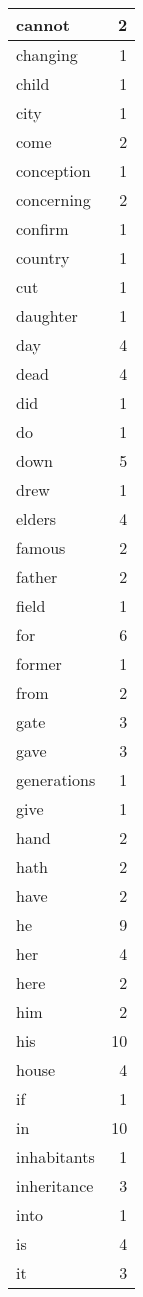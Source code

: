 \begin{center}
\begin{longtable}{l|r}
cannot & 2 \\ \hline
changing & 1 \\ \hline
child & 1 \\ \hline
city & 1 \\ \hline
come & 2 \\ \hline
conception & 1 \\ \hline
concerning & 2 \\ \hline
confirm & 1 \\ \hline
country & 1 \\ \hline
cut & 1 \\ \hline
daughter & 1 \\ \hline
day & 4 \\ \hline
dead & 4 \\ \hline
did & 1 \\ \hline
do & 1 \\ \hline
down & 5 \\ \hline
drew & 1 \\ \hline
elders & 4 \\ \hline
famous & 2 \\ \hline
father & 2 \\ \hline
field & 1 \\ \hline
for & 6 \\ \hline
former & 1 \\ \hline
from & 2 \\ \hline
gate & 3 \\ \hline
gave & 3 \\ \hline
generations & 1 \\ \hline
give & 1 \\ \hline
hand & 2 \\ \hline
hath & 2 \\ \hline
have & 2 \\ \hline
he & 9 \\ \hline
her & 4 \\ \hline
here & 2 \\ \hline
him & 2 \\ \hline
his & 10 \\ \hline
house & 4 \\ \hline
if & 1 \\ \hline
in & 10 \\ \hline
inhabitants & 1 \\ \hline
inheritance & 3 \\ \hline
into & 1 \\ \hline
is & 4 \\ \hline
it & 3 \\ \hline

\end{longtable}
\end{center}
